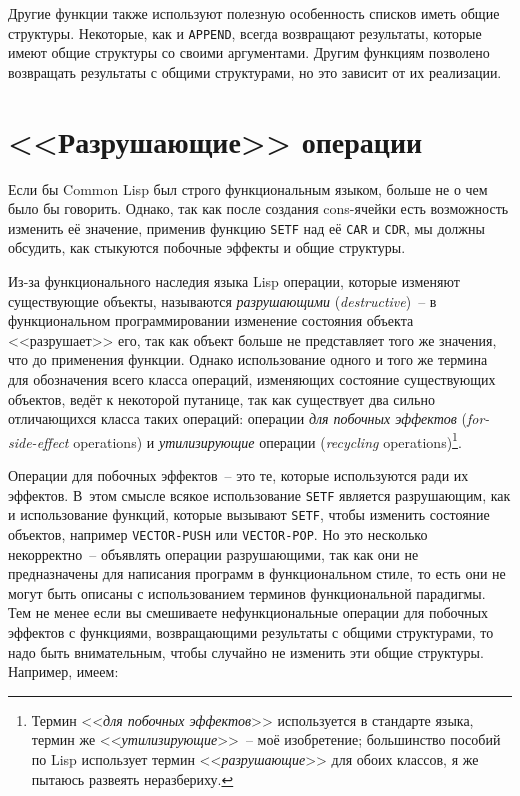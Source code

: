 Другие функции также используют полезную особенность списков иметь общие
структуры. Некоторые, как и \lstinline{APPEND}, всегда возвращают результаты, которые имеют
общие структуры со своими аргументами. Другим функциям позволено возвращать результаты с
общими структурами, но это зависит от их реализации.

\section{<<Разрушающие>> операции}

Если бы Common Lisp был строго функциональным языком, больше не о чем было бы
говорить. Однако, так как после создания cons-ячейки есть возможность изменить её значение,
применив функцию \lstinline{SETF} над её \lstinline{CAR} и \lstinline{CDR}, мы должны обсудить, как
стыкуются побочные эффекты и общие структуры.

Из-за функционального наследия языка Lisp операции, которые изменяют существующие объекты,
называются \textit{разрушающими} (\textit{destructive})~-- в функциональном программировании
изменение состояния объекта <<разрушает>> его, так как объект больше не представляет того же
значения, что до применения функции. Однако использование одного и того же термина для
обозначения всего класса операций, изменяющих состояние существующих объектов, ведёт к некоторой
путанице, так как существует два сильно отличающихся класса таких операций:
операции \textit{для побочных эффектов} (\textit{for-side-effect} operations) и
\textit{утилизирующие} операции (\textit{recycling} operations)\footnote{Термин <<\textit{для
  побочных эффектов}>> используется в стандарте языка, термин же <<\textit{утилизирующие}>>~--
  моё изобретение; большинство пособий по Lisp использует термин <<\textit{разрушающие}>> для
  обоих классов, я же пытаюсь развеять неразбериху.}.

Операции для побочных эффектов~-- это те, которые используются ради их эффектов. В~этом
смысле всякое использование \lstinline{SETF} является разрушающим, как и использование
функций, которые вызывают \lstinline{SETF}, чтобы изменить состояние объектов, например
\lstinline{VECTOR-PUSH} или \lstinline{VECTOR-POP}. Но это несколько некорректно~-- объявлять операции
разрушающими, так как они не предназначены для написания программ в функциональном стиле,
то есть они не могут быть описаны с использованием терминов функциональной парадигмы. Тем не
менее если вы смешиваете нефункциональные операции для побочных эффектов с функциями,
возвращающими результаты с общими структурами, то надо быть внимательным, чтобы случайно
не изменить эти общие структуры. Например, имеем:


